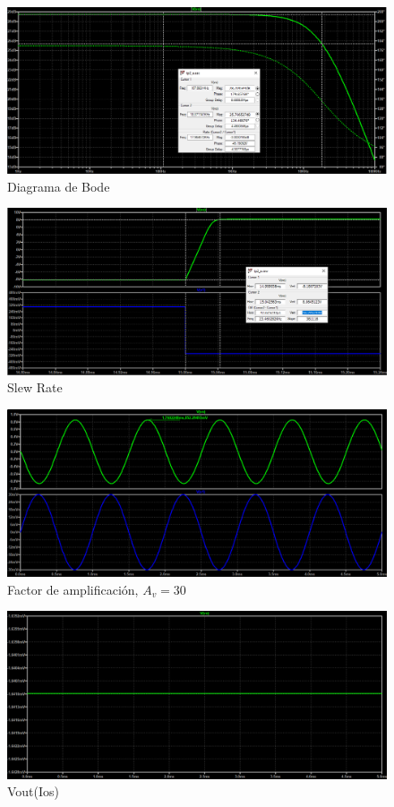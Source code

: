 \documentclass[11pt, a4paper]{article}
\begin{document}
\begin{figure}[H]
    \centering
    \includegraphics[scale=0.4]{Imagenes/bode.png}
    \caption{Diagrama de Bode}
    \label{fig:enter-label}
\end{figure}
\begin{figure}[H]
    \centering
    \includegraphics[scale=0.4]{Imagenes/Slew_Rate_Vin=600mV_PP.png}
    \caption{Slew Rate}
    \label{fig:enter-label}
\end{figure}
\begin{figure}[H]
    \centering
    \includegraphics[scale=0.4]{Imagenes/Vo_Vin=30mV_CA_Ri=50.png}
    \caption{Factor de amplificación, $A_v = 30$}
    \label{fig:enter-label}
\end{figure}
\begin{figure}[H]
    \centering
    \includegraphics[scale=0.4]{Imagenes/Vo_Ios_CC.png}
    \caption{Vout(Ios)}
    \label{fig:enter-label}
\end{figure}
\end{document}
